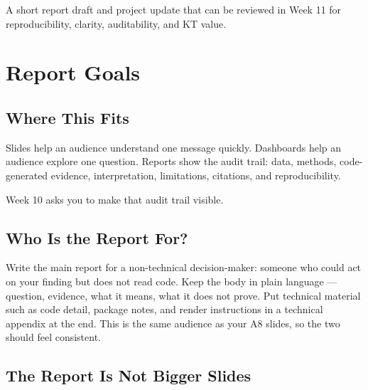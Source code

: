 \documentclass[
  letterpaper,
  DIV=11,
  numbers=noendperiod,
  oneside]{scrreprt}
\begin{document}

A short report draft and project update that can be reviewed in Week 11
for reproducibility, clarity, auditability, and KT value.

\chapter*{Report Goals}\label{report-goals}


\section*{Where This Fits}\label{where-this-fits-21}


Slides help an audience understand one message quickly. Dashboards help
an audience explore one question. Reports show the audit trail: data,
methods, code-generated evidence, interpretation, limitations,
citations, and reproducibility.

Week 10 asks you to make that audit trail visible.

\section*{Who Is the Report For?}\label{who-is-the-report-for}


Write the main report for a non-technical decision-maker: someone who
could act on your finding but does not read code. Keep the body in plain
language --- question, evidence, what it means, what it does not prove.
Put technical material such as code detail, package notes, and render
instructions in a technical appendix at the end. This is the same
audience as your A8 slides, so the two should feel consistent.

\section*{The Report Is Not Bigger
Slides}\label{the-report-is-not-bigger-slides}

\end{document}
